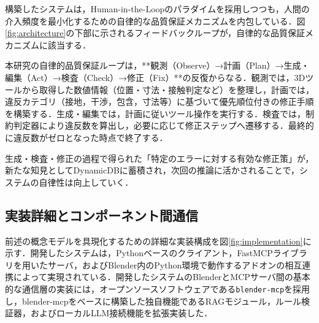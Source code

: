 \documentclass[dvipdfmx, a4paper, 9pt]{deimj}
\begin{document}
構築したシステムは，Human-in-the-Loopのパラダイムを採用しつつも，人間の介入頻度を最小化するための自律的な品質保証メカニズムを内包している．図\ref{fig:architecture}の下部に示されるフィードバックループが，自律的な品質保証メカニズムに該当する．

本研究の自律的品質保証ループは，**観測（Observe）→計画（Plan）→生成・編集（Act）→検査（Check）→修正（Fix）**の反復からなる．観測では，3Dツールから取得した数値情報（位置・寸法・接触判定など）を整理し，計画では，違反カテゴリ（接地，干渉，包含，寸法等）に基づいて優先順位付きの修正手順を構築する．生成・編集では，計画に従いツール操作を実行する．検査では，制約判定器により違反数を算出し，必要に応じて修正ステップへ遷移する．最終的に違反数がゼロとなった時点で終了する．

生成・検査・修正の過程で得られた「特定のエラーに対する有効な修正策」が，新たな知見としてDynamicDBに蓄積され，次回の推論に活かされることで，システムの自律性は向上していく．

\subsection{実装詳細とコンポーネント間通信}

前述の概念モデルを具現化するための詳細な実装構成を図\ref{fig:implementation}に示す．開発したシステムは，Pythonベースのクライアント，FastMCPライブラリを用いたサーバ，およびBlender内のPython環境で動作するアドオンの相互連携によって実現されている．開発したシステムのBlenderとMCPサーバ間の基本的な通信層の実装には，オープンソースソフトウェアである\texttt{blender-mcp}\cite{ahuja2025blendermcp}を採用し，blender-mcpをベースに構築した独自機能であるRAGモジュール，ルール検証器，およびローカルLLM接続機能を拡張実装した．
\end{document}
